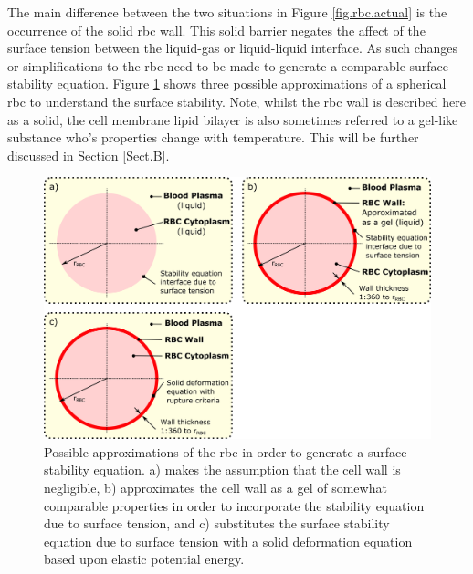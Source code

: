 \noindent The main difference between the two situations in Figure \ref{fig.rbc.actual} is the occurrence of the solid \ac{rbc} wall. This solid barrier negates the affect of the surface tension between the liquid-gas or liquid-liquid interface. As such changes or simplifications to the \ac{rbc} need to be made to generate a comparable surface stability equation. Figure \ref{fig.rbc.approx} shows three possible approximations of a spherical \ac{rbc} to understand the surface stability. Note, whilst the \ac{rbc} wall is described here as a solid, the cell membrane lipid bilayer is also sometimes referred to a gel-like substance \cite{Himbert2017} who's properties change with temperature. This will be further discussed in Section \ref{Sect.B}. 
\\
\begin{figure}[H]
	\centering
	
	\includegraphics[width=1\linewidth]{fig/approx}
	
	\caption{Possible approximations of the \ac{rbc} in order to generate a surface stability equation. a) makes the assumption that the cell wall is negligible, b) approximates the cell wall as a gel of somewhat comparable properties in order to incorporate the stability equation due to surface tension, and c) substitutes the surface stability equation due to surface tension with a solid deformation equation based upon elastic potential energy.  }
	\label{fig.rbc.approx}
\end{figure}

